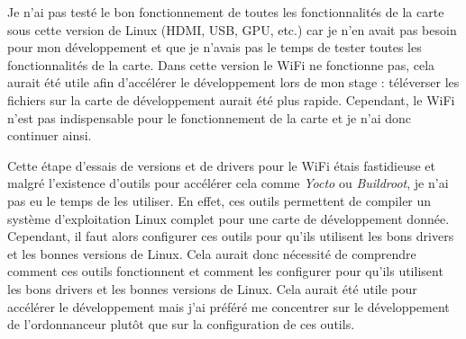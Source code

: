 Je n'ai pas testé le bon fonctionnement de toutes les fonctionnalités de la carte sous cette version de Linux (HDMI, USB, GPU, etc.) car je n'en avait pas besoin pour mon développement et que je n'avais pas le temps de tester toutes les fonctionnalités de la carte. Dans cette version le WiFi ne fonctionne pas, cela aurait été utile afin d'accélérer le développement lors de mon stage : téléverser les fichiers sur la carte de développement aurait été plus rapide. Cependant, le WiFi n'est pas indispensable pour le fonctionnement de la carte et je n'ai donc continuer ainsi.

Cette étape d'essais de versions et de drivers pour le WiFi étais fastidieuse et malgré l'existence d'outils pour accélérer cela comme \textit{Yocto} ou \textit{Buildroot}, je n'ai pas eu le temps de les utiliser. En effet, ces outils permettent de compiler un système d'exploitation Linux complet pour une carte de développement donnée. Cependant, il faut alors configurer ces outils pour qu'ils utilisent les bons drivers et les bonnes versions de Linux. Cela aurait donc nécessité de comprendre comment ces outils fonctionnent et comment les configurer pour qu'ils utilisent les bons drivers et les bonnes versions de Linux. Cela aurait été utile pour accélérer le développement mais j'ai préféré me concentrer sur le développement de l'ordonnanceur plutôt que sur la configuration de ces outils.